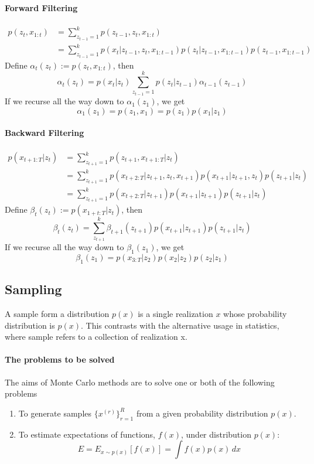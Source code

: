 \documentclass[11pt]{article}
\begin{document}
\paragraph{Forward Filtering}
\begin{align*}
	p(z_t, x_{1:t}) &= \sum_{z_{t-1} = 1}^k p(z_{t-1}, z_t, x_{1:t}) \\
	&= \sum_{z_{t-1} = 1}^k p(x_t|z_{t-1}, z_t, x_{1:t-1})p(z_t|z_{t-1}, x_{1:t-1})p(z_{t-1}, x_{1:t-1})
\end{align*}
Define $\alpha_t(z_t):= p(z_t, x_{1:t})$, then
$$\alpha_t(z_t) = p(x_t|z_t)\sum_{z_{t-1} = 1}^k p(z_t|z_{t-1})\alpha_{t-1}(z_{t-1})$$
If we recurse all the way down to $\alpha_1(z_1)$, we get
$$\alpha_1(z_1) = p(z_1, x_1) = p(z_1)p(x_1|z_1)$$
\paragraph{Backward Filtering}
\begin{align*}
	p(x_{t+1:T}|z_t) &= \sum_{z_{t+1} = 1}^k p(z_{t+1}, x_{t+1:T} |z_t)\\
	&= \sum_{z_{t+1} = 1}^k p(x_{t+2:T}|z_{t+1}, z_t,x_{t+1})p(x_{t+1}|z_{t+1}, z_t)p(z_{t+1}|z_t) \\
	&=\sum_{z_{t+1} = 1}^k p(x_{t+2:T}|z_{t+1})p(x_{t+1}|z_{t+1})p(z_{t+1}|z_t) 
\end{align*}
Define $\beta_t(z_t):= p(x_{1 + t:T}|z_t)$, then
$$\beta_t (z_t) = \sum_{z_{t+1}}^k \beta_{t+1}(z_{t+1})p(x_{t+1}|z_{t+1})p(z_{t+1}|z_t)$$
If we recurse all the way down to $\beta_1(z_1)$, we get 
$$\beta_1(z_1) = p(x_{3:T}|z_2)p(x_2|z_2)p(z_2|z_1)$$

\subsection{Sampling}
A sample form a distribution $p(x)$ is a single realization $x$ whose probability distribution is $p(x)$. This contrasts with the alternative usage in statistics, where sample refers to a collection of realization x.

\paragraph{The problems to be solved}
The aims of Monte Carlo methods are to solve one or both of the following problems
\begin{enumerate}
	\item To generate samples $\{x^{(r)}\}_{r=1}^R$ from a given probability distribution $p(x)$.
	\item To estimate expectations of functions, $f(x)$, under distribution $p(x)$: $$E = E_{x\sim p(x)}[f(x)] = \int f(x)p(x)\,dx$$
\end{enumerate}
\end{document}
